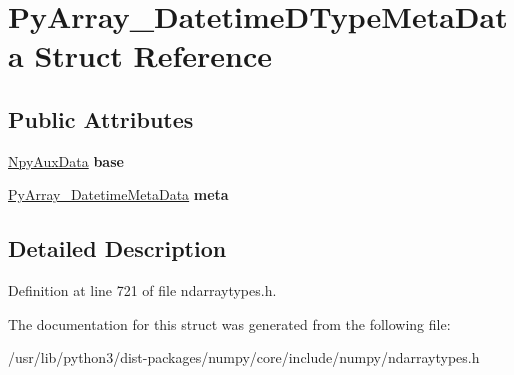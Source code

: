 \hypertarget{structPyArray__DatetimeDTypeMetaData}{}\section{Py\+Array\+\_\+\+Datetime\+D\+Type\+Meta\+Data Struct Reference}
\label{structPyArray__DatetimeDTypeMetaData}
\subsection*{Public Attributes}
\begin{DoxyCompactItemize}
\item 
\hyperlink{structNpyAuxData__tag}{Npy\+Aux\+Data} {\bfseries base}\hypertarget{structPyArray__DatetimeDTypeMetaData_aa4aeb5a80f1c13da13559ce8cb079cad}{}\label{structPyArray__DatetimeDTypeMetaData_aa4aeb5a80f1c13da13559ce8cb079cad}

\item 
\hyperlink{structPyArray__DatetimeMetaData}{Py\+Array\+\_\+\+Datetime\+Meta\+Data} {\bfseries meta}\hypertarget{structPyArray__DatetimeDTypeMetaData_a51264309a5c295a3d8a1335a60c33f19}{}\label{structPyArray__DatetimeDTypeMetaData_a51264309a5c295a3d8a1335a60c33f19}

\end{DoxyCompactItemize}


\subsection{Detailed Description}


Definition at line 721 of file ndarraytypes.\+h.



The documentation for this struct was generated from the following file\+:\begin{DoxyCompactItemize}
\item 
/usr/lib/python3/dist-\/packages/numpy/core/include/numpy/ndarraytypes.\+h\end{DoxyCompactItemize}
